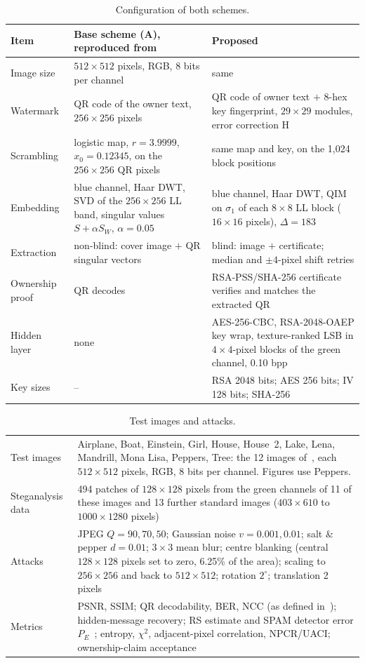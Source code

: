 \documentclass[11pt,a4paper]{article}
\begin{document}
\begin{table}[!htbp]
\centering\small
\caption{Configuration of both schemes.}\label{tab:params}
\begin{tabularx}{\textwidth}{@{}lXX@{}}
\toprule
Item & Base scheme (A), reproduced from~\cite{sanivarapu2022} & Proposed \\
\midrule
Image size & $512\times512$ pixels, RGB, 8 bits per channel & same \\
Watermark & QR code of the owner text, $256\times256$ pixels & QR code of owner text $+$ 8-hex key fingerprint, $29\times29$ modules, error correction H \\
Scrambling & logistic map, $r=3.9999$, $x_0=0.12345$, on the $256\times256$ QR pixels & same map and key, on the 1{,}024 block positions \\
Embedding & blue channel, Haar DWT, SVD of the $256\times256$ LL band, singular values $S+\alpha S_W$, $\alpha=0.05$ & blue channel, Haar DWT, QIM on $\sigma_1$ of each $8\times8$ LL block ($16\times16$ pixels), $\Delta=183$ \\
Extraction & non-blind: cover image $+$ QR singular vectors & blind: image $+$ certificate; median and $\pm4$-pixel shift retries \\
Ownership proof & QR decodes & RSA-PSS/SHA-256 certificate verifies and matches the extracted QR \\
Hidden layer & none & AES-256-CBC, RSA-2048-OAEP key wrap, texture-ranked LSB in $4\times4$-pixel blocks of the green channel, 0.10 bpp \\
Key sizes & -- & RSA 2048 bits; AES 256 bits; IV 128 bits; SHA-256 \\
\bottomrule
\end{tabularx}
\end{table}

\begin{table}[!htbp]
\centering\small
\caption{Test images and attacks.}\label{tab:data}
\begin{tabularx}{\textwidth}{@{}lX@{}}
\toprule
Test images & Airplane, Boat, Einstein, Girl, House, House~2, Lake, Lena, Mandrill, Mona Lisa, Peppers, Tree: the 12 images of~\cite{sanivarapu2022}, each $512\times512$ pixels, RGB, 8 bits per channel. Figures use Peppers. \\
Steganalysis data & 494 patches of $128\times128$ pixels from the green channels of 11 of these images and 13 further standard images ($403\times610$ to $1000\times1280$ pixels) \\
Attacks & JPEG $Q=90,70,50$; Gaussian noise $v=0.001, 0.01$; salt \& pepper $d=0.01$; $3\times3$ mean blur; centre blanking (central $128\times128$ pixels set to zero, 6.25\% of the area); scaling to $256\times256$ and back to $512\times512$; rotation $2^\circ$; translation 2 pixels \\
Metrics & PSNR, SSIM; QR decodability, BER, NCC (as defined in~\cite{sanivarapu2022}); hidden-message recovery; RS estimate and SPAM detector error $P_E$~\cite{pevny2010spam}; entropy, $\chi^2$, adjacent-pixel correlation, NPCR/UACI; ownership-claim acceptance \\
\bottomrule
\end{tabularx}
\end{table}
\end{document}
